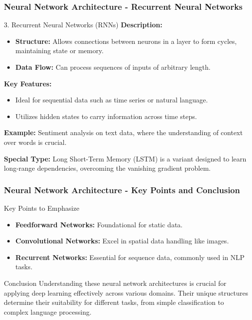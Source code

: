 \documentclass[aspectratio=169]{beamer}
\begin{document}
\begin{frame}[fragile]
  \frametitle{Neural Network Architecture - Recurrent Neural Networks}
  \begin{block}{3. Recurrent Neural Networks (RNNs)}
    \textbf{Description:}
    \begin{itemize}
      \item \textbf{Structure:} Allows connections between neurons in a layer to form cycles, maintaining state or memory.
      \item \textbf{Data Flow:} Can process sequences of inputs of arbitrary length.
    \end{itemize}

    \textbf{Key Features:}
    \begin{itemize}
      \item Ideal for sequential data such as time series or natural language.
      \item Utilizes hidden states to carry information across time steps.
    \end{itemize}

    \textbf{Example:} Sentiment analysis on text data, where the understanding of context over words is crucial.

    \textbf{Special Type:} Long Short-Term Memory (LSTM) is a variant designed to learn long-range dependencies, overcoming the vanishing gradient problem.
  \end{block}
\end{frame}

\begin{frame}[fragile]
  \frametitle{Neural Network Architecture - Key Points and Conclusion}
  \begin{block}{Key Points to Emphasize}
    \begin{itemize}
      \item \textbf{Feedforward Networks:} Foundational for static data.
      \item \textbf{Convolutional Networks:} Excel in spatial data handling like images.
      \item \textbf{Recurrent Networks:} Essential for sequence data, commonly used in NLP tasks.
    \end{itemize}
  \end{block}
  
  \begin{block}{Conclusion}
    Understanding these neural network architectures is crucial for applying deep learning effectively across various domains. Their unique structures determine their suitability for different tasks, from simple classification to complex language processing.
  \end{block}
\end{frame}
\end{document}
